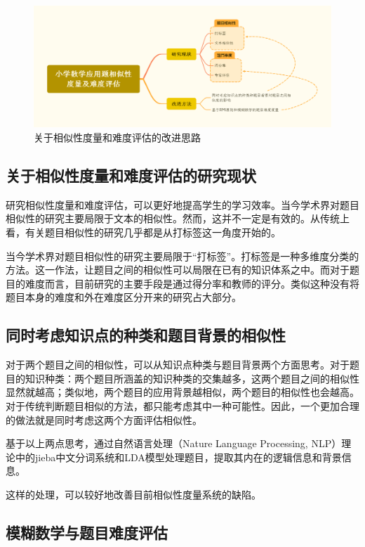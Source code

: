 \begin{figure}[h]
    \centering
    \includegraphics[scale=0.22]{res/figure042227.png}
    \caption{关于相似性度量和难度评估的改进思路}
\end{figure}
 
\subsection{关于相似性度量和难度评估的研究现状}

研究相似性度量和难度评估，可以更好地提高学生的学习效率。当今学术界对题目相似性的研究主要局限于文本的相似性。然而，这并不一定是有效的。从传统上看，有关题目相似性的研究几乎都是从打标签这一角度开始的\cite{xuTimunandupinggufangfayanjiuzongshu2022}。

当今学术界对题目相似性的研究主要局限于“打标签”。打标签是一种多维度分类的方法。这一作法，让题目之间的相似性可以局限在已有的知识体系之中。而对于题目的难度而言，目前研究的主要手段是通过得分率和教师的评分。类似这种没有将题目本身的难度和外在难度区分开来的研究占大部分。

\subsection{同时考虑知识点的种类和题目背景的相似性}

对于两个题目之间的相似性，可以从知识点种类与题目背景两个方面思考。对于题目的知识种类：两个题目所涵盖的知识种类的交集越多，这两个题目之间的相似性显然就越高；类似地，两个题目的应用背景越相似，两个题目的相似性也会越高。对于传统判断题目相似的方法，都只能考虑其中一种可能性。因此，一个更加合理的做法就是同时考虑这两个方面评估相似性。

基于以上两点思考，通过自然语言处理（Nature Language Processing, NLP）理论中的jieba中文分词系统和LDA模型处理题目，提取其内在的逻辑信息和背景信息。

这样的处理，可以较好地改善目前相似性度量系统的缺陷。

\subsection{模糊数学与题目难度评估}

